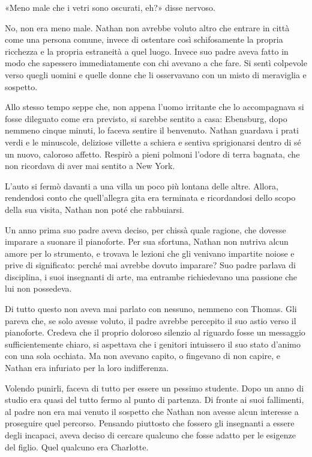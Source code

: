 \documentclass[a4paper,oneside,10pt]{memoir}
\begin{document}
«Meno male che i vetri sono oscurati, eh?» disse nervoso.

No, non era meno male. Nathan non avrebbe voluto altro che entrare in città come una persona comune, invece di
ostentare così schifosamente la propria ricchezza e la propria estraneità a quel luogo. Invece suo padre aveva fatto
in modo che sapessero immediatamente con chi avevano a che fare. Si sentì colpevole verso quegli uomini e quelle donne
che li osservavano con un misto di meraviglia e sospetto.

Allo stesso tempo seppe che, non appena l'uomo irritante che lo accompagnava si fosse dileguato come era previsto, si
sarebbe sentito a casa: Ebensburg, dopo nemmeno cinque minuti, lo faceva sentire il benvenuto. Nathan guardava i prati
verdi e le minuscole, deliziose villette a schiera e sentiva sprigionarsi dentro di sé un nuovo, caloroso affetto.
Respirò a pieni polmoni l'odore di terra bagnata, che non ricordava di aver mai sentito a New York.

L'auto si fermò davanti a una villa un poco più lontana delle altre. Allora, rendendosi conto che quell'allegra gita
era terminata e ricordandosi dello scopo della sua visita, Nathan non poté che rabbuiarsi.

Un anno prima suo padre aveva deciso, per chissà quale ragione, che dovesse imparare a suonare il pianoforte. Per sua
sfortuna, Nathan non nutriva alcun amore per lo strumento, e trovava le lezioni che gli venivano impartite noiose e
prive di significato: perché mai avrebbe dovuto imparare? Suo padre parlava di disciplina, i suoi insegnanti di arte,
ma entrambe richiedevano una passione che lui non possedeva.

Di tutto questo non aveva mai parlato con nessuno, nemmeno con Thomas. Gli pareva che, se solo avesse voluto, il padre
avrebbe percepito il suo astio verso il pianoforte. Credeva che il proprio doloroso silenzio al riguardo fosse un
messaggio sufficientemente chiaro, si aspettava che i genitori intuissero il suo stato d'animo con una sola occhiata. Ma
non avevano capito, o fingevano di non capire, e Nathan era infuriato per la loro indifferenza.

Volendo punirli, faceva di tutto per essere un pessimo studente. Dopo un anno di studio era quasi del tutto fermo al
punto di partenza. Di fronte ai suoi fallimenti, al padre non era mai venuto il sospetto che Nathan non avesse alcun
interesse a proseguire quel percorso. Pensando piuttosto che fossero gli insegnanti a essere degli incapaci, aveva
deciso di cercare qualcuno che fosse adatto per le esigenze del figlio. Quel qualcuno era Charlotte.
\end{document}
